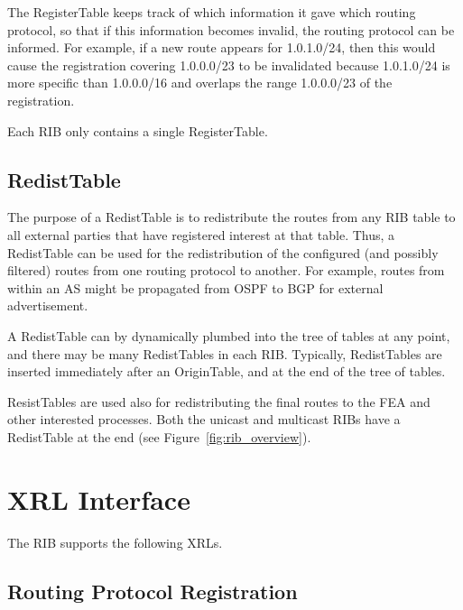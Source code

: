 \documentclass[11pt]{article}
\begin{document}
The RegisterTable keeps track of which information it gave which
routing protocol, so that if this information becomes invalid, the
routing protocol can be informed.  For example, if a new route appears
for 1.0.1.0/24, then this would cause the registration covering
1.0.0.0/23 to be invalidated because 1.0.1.0/24 is more specific than
1.0.0.0/16 and overlaps the range 1.0.0.0/23 of the registration.

Each RIB only contains a single RegisterTable.

\subsection{RedistTable}

The purpose of a RedistTable is to redistribute the routes from any RIB
table to all external parties that have registered interest at that
table. Thus, a RedistTable can be used for the redistribution of the
configured (and possibly filtered) routes from one routing protocol to
another.  For example, routes from within an AS might be propagated from
OSPF to BGP for external advertisement.

A RedistTable can by dynamically plumbed into the tree of tables at any
point, and there may be many RedistTables in each RIB. Typically,
RedistTables are inserted immediately after an OriginTable, and at the
end of the tree of tables.

ResistTables are used also for redistributing the final routes to the
FEA and other interested processes. Both the unicast and multicast RIBs
have a RedistTable at the end (see Figure~\ref{fig:rib_overview}).

\section{XRL Interface}

The RIB supports the following XRLs.

\subsection{Routing Protocol Registration}
\end{document}

